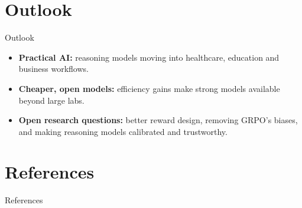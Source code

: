 \documentclass[xcolor=svgnames]{beamer}
\begin{document}
\section{Outlook}
\begin{frame}{Outlook}
\begin{itemize}
  \item \textbf{Practical AI:} reasoning models moving into healthcare, education and business workflows.
  \item \textbf{Cheaper, open models:} efficiency gains make strong models available beyond large labs.
  \item \textbf{Open research questions:} better reward design, removing GRPO's biases, and making reasoning models calibrated and trustworthy.
\end{itemize}
\end{frame}

\section*{References}
\begin{frame}[allowframebreaks]{References}
  \scriptsize
  
  
\end{frame}
\end{document}
